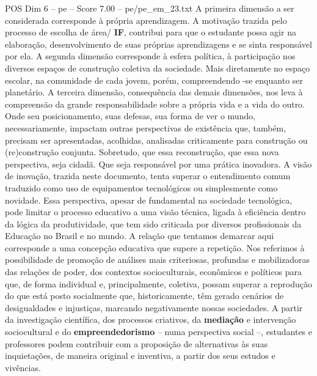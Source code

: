 \begin{textsample}{POS Dim 6 – pe – Score 7.00 – pe/pe\_em\_23.txt}
A primeira dimensão a ser considerada corresponde à própria aprendizagem.
A motivação trazida pelo processo de escolha de área/ \textbf{IF}, contribui para que o estudante possa agir na elaboração, desenvolvimento de suas próprias aprendizagens e se sinta responsável por ela.
A segunda dimensão corresponde à esfera política, à participação nos diversos espaços de construção coletiva da sociedade.
Mais diretamente no espaço escolar, na comunidade de cada jovem, porém, compreendendo -se enquanto ser planetário.
A terceira dimensão, consequência das demais dimensões, nos leva à compreensão da grande responsabilidade sobre a própria vida e a vida do outro.
Onde seu posicionamento, suas defesas, sua forma de ver o mundo, necessariamente, impactam outras perspectivas de existência que, também, precisam ser apresentadas, acolhidas, analisadas criticamente para construção ou (re)construção conjunta.
Sobretudo, que essa reconstrução, que essa nova perspectiva, seja cidadã.
Que seja responsável por uma prática inovadora.
A visão de inovação, trazida neste documento, tenta superar o entendimento comum traduzido como uso de equipamentos tecnológicos ou simplesmente como novidade.
Essa perspectiva, apesar de fundamental na sociedade tecnológica, pode limitar o processo educativo a uma visão técnica, ligada à eficiência dentro da lógica da produtividade, que tem sido criticada por diversos profissionais da Educação no Brasil e no mundo.
A relação que tentamos demarcar aqui corresponde a uma concepção educativa que supere a repetição.
Nos referimos à possibilidade de promoção de análises mais criteriosas, profundas e mobilizadoras das relações de poder, dos contextos socioculturais, econômicos e políticos para que, de forma individual e, principalmente, coletiva, possam superar a reprodução do que está posto socialmente que, historicamente, têm gerado cenários de desigualdades e injustiças, marcando negativamente nossas sociedades.
A partir da investigação científica, dos processos criativos, da \textbf{mediação} e intervenção sociocultural e do \textbf{empreendedorismo} – numa perspectiva social –, estudantes e professores podem contribuir com a proposição de alternativas às suas inquietações, de maneira original e inventiva, a partir dos seus estudos e vivências.

\end{textsample}
